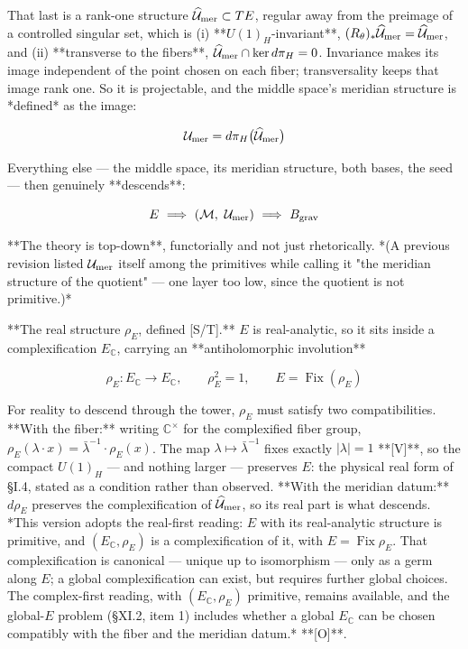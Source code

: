 That last is a rank-one structure $\widehat{\mathcal{U} }_{\rm mer}\subset TE$, regular away from the preimage of a controlled singular set, which is (i) **$U(1)_H$-invariant**, $(R_\theta)_*\widehat{\mathcal{U} }_{\rm mer} = \widehat{\mathcal{U} }_{\rm mer}$, and (ii) **transverse to the fibers**, $\widehat{\mathcal{U} }_{\rm mer}\cap\ker d\pi_H = 0$. Invariance makes its image independent of the point chosen on each fiber; transversality keeps that image rank one. So it is projectable, and the middle space's meridian structure is *defined* as the image:

$$\mathcal{U}_{\rm mer} = d\pi_H\big(\widehat{\mathcal{U} }_{\rm mer}\big)$$

Everything else — the middle space, its meridian structure, both bases, the seed — then genuinely **descends**:

$$E\ \Longrightarrow\ (\mathcal{M},\ \mathcal{U}_{\rm mer})\ \Longrightarrow\ B_{\rm grav}$$

**The theory is top-down**, functorially and not just rhetorically. *(A previous revision listed $\mathcal{U}_{\rm mer}$ itself among the primitives while calling it "the meridian structure of the quotient" — one layer too low, since the quotient is not primitive.)*

**The real structure $\rho_E$, defined [S/T].** $E$ is real-analytic, so it sits inside a complexification $E_\mathbb{C}$, carrying an **antiholomorphic involution**

$$\rho_E:E_\mathbb{C}\to E_\mathbb{C},\qquad\rho_E^2 = 1,\qquad E = \operatorname{Fix}(\rho_E)$$

For reality to descend through the tower, $\rho_E$ must satisfy two compatibilities. **With the fiber:** writing $\mathbb{C}^\times$ for the complexified fiber group, $\rho_E(\lambda\cdot x) = \bar\lambda^{-1}\cdot\rho_E(x)$. The map $\lambda\mapsto\bar\lambda^{-1}$ fixes exactly $|\lambda| = 1$ **[V]**, so the compact $U(1)_H$ — and nothing larger — preserves $E$: the physical real form of §I.4, stated as a condition rather than observed. **With the meridian datum:** $d\rho_E$ preserves the complexification of $\widehat{\mathcal{U} }_{\rm mer}$, so its real part is what descends. *This version adopts the real-first reading: $E$ with its real-analytic structure is primitive, and $(E_\mathbb{C},\rho_E)$ is a complexification of it, with $E = \operatorname{Fix}\rho_E$. That complexification is canonical — unique up to isomorphism — only as a germ along $E$; a global complexification can exist, but requires further global choices. The complex-first reading, with $(E_\mathbb{C},\rho_E)$ primitive, remains available, and the global-$E$ problem (§XI.2, item 1) includes whether a global $E_\mathbb{C}$ can be chosen compatibly with the fiber and the meridian datum.* **[O]**.

